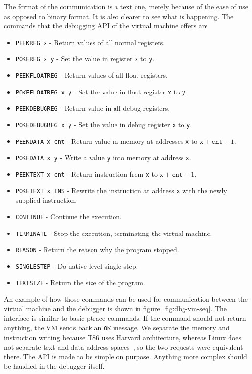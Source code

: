 The format of the communication is a text one, merely because of the ease of
use as opposed to binary format. It is also clearer to see what is happening.
The commands that the debugging API of the virtual machine offers are
\begin{itemize}
    \item \texttt{PEEKREG x} - Return values of all normal registers.
    \item \texttt{POKEREG x y} - Set the value in register \texttt{x} to
        \texttt{y}.
    \item \texttt{PEEKFLOATREG} - Return values of all float registers.
    \item \texttt{POKEFLOATREG x y} - Set the value in float register
        \texttt{x} to \texttt{y}.
    \item \texttt{PEEKDEBUGREG} - Return value in all debug registers.
    \item \texttt{POKEDEBUGREG x y} - Set the value in debug register
        \texttt{x} to \texttt{y}.
    \item \texttt{PEEKDATA x cnt} - Return value in memory at addresses
        \texttt{x} to $\texttt{x} + \texttt{cnt} - 1$.
    \item \texttt{POKEDATA x y} - Write a value \texttt{y} into memory at
        address \texttt{x}.
    \item \texttt{PEEKTEXT x cnt} - Return instruction from \texttt{x} to $\texttt{x} + \texttt{cnt} - 1$.
    \item \texttt{POKETEXT x INS} - Rewrite the instruction at address
        \texttt{x} with the newly supplied instruction.
    \item \texttt{CONTINUE} - Continue the execution.
    \item \texttt{TERMINATE} - Stop the execution, terminating the virtual machine.
    \item \texttt{REASON} - Return the reason why the program stopped.
    \item \texttt{SINGLESTEP} - Do native level single step.
    \item \texttt{TEXTSIZE} - Return the size of the program.
\end{itemize}

An example of how those commands can be used for communication between the
virtual machine and the debugger is shown in figure~\ref{fig:dbg-vm-seq}. The
interface is similar to basic ptrace commands. If the command should not return
anything, the VM sends back an \texttt{OK} message. We separate the memory and
instruction writing because T86 uses Harvard architecture, whereas Linux does
not separate text and data address spaces~\cite{ptrace}, so the two requests
were equivalent there. The API is made to be simple on purpose. Anything more
complex should be handled in the debugger itself.

